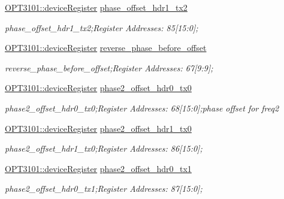 \begin{DoxyCompactItemize}
\mbox{\hyperlink{class_o_p_t3101_1_1device_register}{O\+P\+T3101\+::device\+Register}} \mbox{\hyperlink{class_o_p_t3101_1_1registers_a93c4864a0cb0b3ff977feb3616602d88}{phase\+\_\+offset\+\_\+hdr1\+\_\+tx2}}
\begin{DoxyCompactList}\small\item\em phase\+\_\+offset\+\_\+hdr1\+\_\+tx2;Register Addresses\+: 85\mbox{[}15\+:0\mbox{]}; \end{DoxyCompactList}\item 
\mbox{\hyperlink{class_o_p_t3101_1_1device_register}{O\+P\+T3101\+::device\+Register}} \mbox{\hyperlink{class_o_p_t3101_1_1registers_aebfa1d50fe62568c3121d3399e717893}{reverse\+\_\+phase\+\_\+before\+\_\+offset}}
\begin{DoxyCompactList}\small\item\em reverse\+\_\+phase\+\_\+before\+\_\+offset;Register Addresses\+: 67\mbox{[}9\+:9\mbox{]}; \end{DoxyCompactList}\item 
\mbox{\hyperlink{class_o_p_t3101_1_1device_register}{O\+P\+T3101\+::device\+Register}} \mbox{\hyperlink{class_o_p_t3101_1_1registers_afbc8fd08fff8b8dc10f7a71965ffadcf}{phase2\+\_\+offset\+\_\+hdr0\+\_\+tx0}}
\begin{DoxyCompactList}\small\item\em phase2\+\_\+offset\+\_\+hdr0\+\_\+tx0;Register Addresses\+: 68\mbox{[}15\+:0\mbox{]};phase offset for freq2 \end{DoxyCompactList}\item 
\mbox{\hyperlink{class_o_p_t3101_1_1device_register}{O\+P\+T3101\+::device\+Register}} \mbox{\hyperlink{class_o_p_t3101_1_1registers_ab0add9e2d51e615979fe97bf69669795}{phase2\+\_\+offset\+\_\+hdr1\+\_\+tx0}}
\begin{DoxyCompactList}\small\item\em phase2\+\_\+offset\+\_\+hdr1\+\_\+tx0;Register Addresses\+: 86\mbox{[}15\+:0\mbox{]}; \end{DoxyCompactList}\item 
\mbox{\hyperlink{class_o_p_t3101_1_1device_register}{O\+P\+T3101\+::device\+Register}} \mbox{\hyperlink{class_o_p_t3101_1_1registers_a36f5ab204e85f8e82fa6fea617a86df2}{phase2\+\_\+offset\+\_\+hdr0\+\_\+tx1}}
\begin{DoxyCompactList}\small\item\em phase2\+\_\+offset\+\_\+hdr0\+\_\+tx1;Register Addresses\+: 87\mbox{[}15\+:0\mbox{]}; \end{DoxyCompactList}\item 

\end{DoxyCompactItemize}

